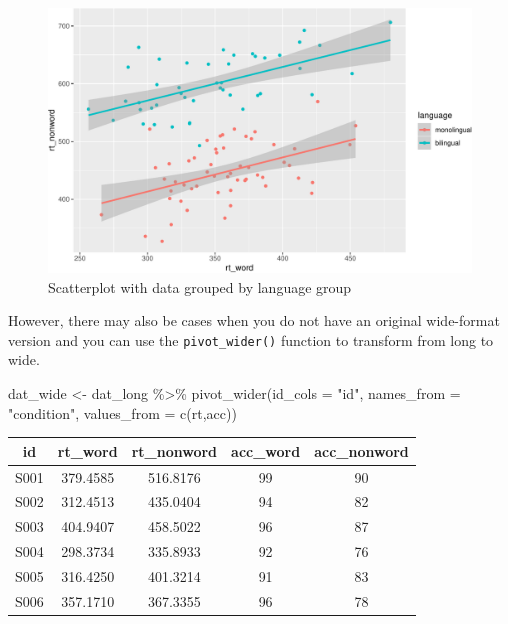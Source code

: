 \documentclass[
  english,
  doc,floatsintext]{apa6}
\newenvironment{Shaded}{\begin{snugshade}}{\end{snugshade}}
\newcommand{\AttributeTok}[1]{\textcolor[rgb]{0.77,0.63,0.00}{#1}}
\newcommand{\FunctionTok}[1]{\textcolor[rgb]{0.00,0.00,0.00}{#1}}
\newcommand{\NormalTok}[1]{#1}
\newcommand{\OtherTok}[1]{\textcolor[rgb]{0.56,0.35,0.01}{#1}}
\newcommand{\SpecialCharTok}[1]{\textcolor[rgb]{0.00,0.00,0.00}{#1}}
\newcommand{\StringTok}[1]{\textcolor[rgb]{0.31,0.60,0.02}{#1}}
\begin{document}
\begin{figure}

{\centering \includegraphics[width=1\linewidth]{images/unnamed-chunk-15-1} 

}

\caption{Scatterplot with data grouped by language group}\label{fig:unnamed-chunk-15}
\end{figure}

However, there may also be cases when you do not have an original wide-format version and you can use the \texttt{pivot\_wider()} function to transform from long to wide.

\begin{Shaded}
\begin{Highlighting}[]
\NormalTok{dat\_wide }\OtherTok{\textless{}{-}}\NormalTok{ dat\_long }\SpecialCharTok{\%\textgreater{}\%}
  \FunctionTok{pivot\_wider}\NormalTok{(}\AttributeTok{id\_cols =} \StringTok{"id"}\NormalTok{,}
              \AttributeTok{names\_from =} \StringTok{"condition"}\NormalTok{, }
              \AttributeTok{values\_from =} \FunctionTok{c}\NormalTok{(rt,acc))}
\end{Highlighting}
\end{Shaded}

\begin{tabular}{c|c|c|c|c}
\hline
id & rt\_word & rt\_nonword & acc\_word & acc\_nonword\\
\hline
S001 & 379.4585 & 516.8176 & 99 & 90\\
\hline
S002 & 312.4513 & 435.0404 & 94 & 82\\
\hline
S003 & 404.9407 & 458.5022 & 96 & 87\\
\hline
S004 & 298.3734 & 335.8933 & 92 & 76\\
\hline
S005 & 316.4250 & 401.3214 & 91 & 83\\
\hline
S006 & 357.1710 & 367.3355 & 96 & 78\\
\hline
\end{tabular}
\end{document}
